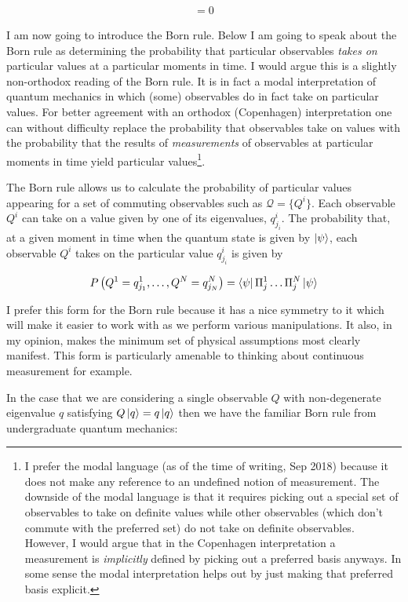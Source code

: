 \documentclass[12pt]{article}
\begin{document}
\begin{align}
[Q^i,Q^j] = 0
\end{align}

I am now going to introduce the Born rule. Below I am going to speak about the Born rule as determining the probability that particular observables \textit{takes on} particular values at a particular moments in time. I would argue this is a slightly non-orthodox reading of the Born rule. It is in fact a modal interpretation of quantum mechanics in which (some) observables do in fact take on particular values. For better agreement with an orthodox (Copenhagen) interpretation one can without difficulty replace the probability that observables take on values with the probability that the results of \textit{measurements} of observables at particular moments in time yield particular values\footnote{I prefer the modal language (as of the time of writing, Sep 2018) because it does not make any reference to an undefined notion of measurement. The downside of the modal language is that it requires picking out a special set of observables to take on definite values while other observables (which don't commute with the preferred set) do not take on definite observables. However, I would argue that in the Copenhagen interpretation a measurement is \textit{implicitly} defined by picking out a preferred basis anyways. In some sense the modal interpretation helps out by just making that preferred basis explicit.}.

The Born rule allows us to calculate the probability of particular values appearing for a set of commuting observables such as $\mathcal{Q} = \{Q^i\}$. Each observable $Q^i$ can take on a value given by one of its eigenvalues, $q^i_{j_i}$. The probability that, at a given moment in time when the quantum state is given by $\ket{\psi}$, each observable $Q^i$ takes on the particular value $q^i_{j_i}$ is given by

\begin{align}
P\left(Q^1 = q^1_{j_1}, \ldots, Q^N = q^N_{j_N}\right) = \Bra{\psi} \Pi^1_j \ldots \Pi^N_j \Ket{\psi}
\end{align}

I prefer this form for the Born rule because it has a nice symmetry to it which will make it easier to work with as we perform various manipulations. It also, in my opinion, makes the minimum set of physical assumptions most clearly manifest. This form is particularly amenable to thinking about continuous measurement for example.

In the case that we are considering a single observable $Q$ with non-degenerate eigenvalue $q$ satisfying $Q\ket{q} = q\ket{q}$ then we have the familiar Born rule from undergraduate quantum mechanics:
\end{document}
